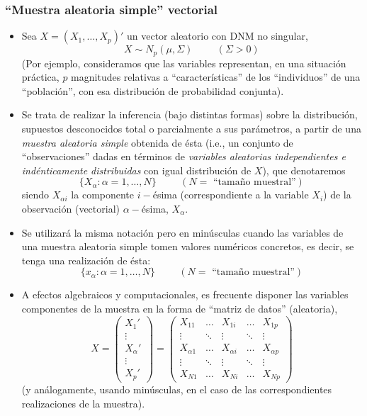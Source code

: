\documentclass[11pt,a4paper]{article}
\begin{document}
\subsubsection{``Muestra aleatoria simple'' vectorial}
\begin{itemize}
\item Sea $X = (X_{1}, \dots, X_{p})'$ un vector aleatorio con DNM no singular,
$$X \sim N_{p} (\mu, \Sigma) \hspace{1cm} (\Sigma > 0)$$
(Por ejemplo, consideramos que las variables representan, en una situación práctica, $p$ magnitudes relativas a ``características'' de los ``individuos'' de una ``población'', con esa distribución de probabilidad conjunta).

\item Se trata de realizar la inferencia (bajo distintas formas) sobre la distribución, supuestos desconocidos total o parcialmente a sus parámetros, a partir de una \emph{muestra aleatoria simple} obtenida de ésta (i.e., un conjunto de ``observaciones'' dadas en términos de \emph{variables aleatorias independientes e indénticamente distribuidas} con igual distribución de $X$), que denotaremos
$$\{X_{\alpha}: \alpha = 1, \dots, N\} \hspace{1cm} (N = \text{ ``tamaño muestral''})$$
siendo $X_{\alpha i}$ la componente $i-$ésima (correspondiente a la variable $X_{i}$) de la observación (vectorial) $\alpha-$ésima, $X_{\alpha}$.

\item Se utilizará la misma notación pero en minúsculas cuando las variables de una muestra aleatoria simple tomen valores numéricos concretos, es decir, se tenga una realización de ésta:
$$\{x_{\alpha}: \alpha = 1, \dots, N\} \hspace{1cm} (N = \text{ ``tamaño muestral''})$$

\item A efectos algebraicos y computacionales, es frecuente disponer las variables componentes de la muestra en la forma de ``matriz de datos'' (aleatoria),
$$X = \begin{pmatrix}
X_{1}' \\ \vdots \\ X_{\alpha}' \\ \vdots \\ X_{p}'
\end{pmatrix} = \begin{pmatrix}
X_{11} & \dots & X_{1i} & \dots & X_{1p} \\
\vdots & \ddots & \vdots & \ddots & \vdots \\
X_{\alpha 1} & \dots & X_{\alpha i} & \dots & X_{\alpha p} \\
\vdots & \ddots & \vdots & \ddots & \vdots \\
X_{N1} & \dots & X_{Ni} & \dots & X_{Np}
\end{pmatrix}$$
(y análogamente, usando minúsculas, en el caso de las correspondientes realizaciones de la muestra).
\end{itemize}
\end{document}
